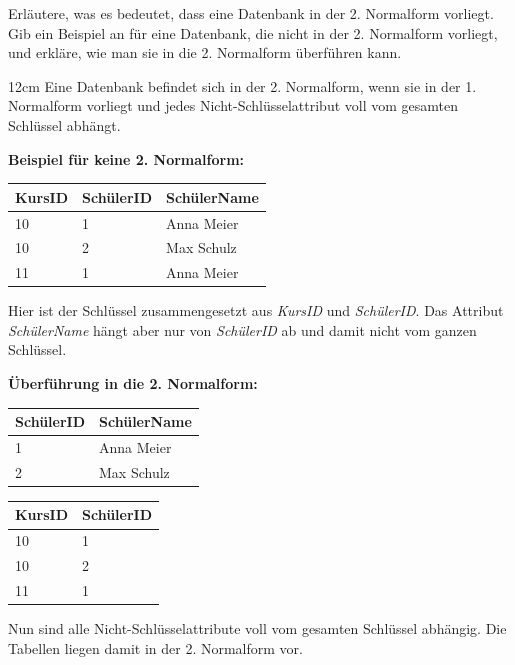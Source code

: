 \question[4]
Erläutere, was es bedeutet, dass eine Datenbank in der 2. Normalform vorliegt.
Gib ein Beispiel an für eine Datenbank, die nicht in der 2. Normalform vorliegt,
und erkläre, wie man sie in die 2. Normalform überführen kann.


\begin{solutionbox}{12cm}
Eine Datenbank befindet sich in der 2. Normalform, wenn sie in der 1. Normalform vorliegt
und jedes Nicht-Schlüsselattribut voll vom gesamten Schlüssel abhängt.

\vspace{0.2cm}

\textbf{Beispiel für keine 2. Normalform:}

\begin{center}
\begin{tabular}{|l|l|l|}
\hline
KursID & SchülerID & SchülerName \\
\hline
10 & 1 & Anna Meier \\
10 & 2 & Max Schulz \\
11 & 1 & Anna Meier \\
\hline
\end{tabular}
\end{center}

Hier ist der Schlüssel zusammengesetzt aus \textit{KursID} und \textit{SchülerID}.
Das Attribut \textit{SchülerName} hängt aber nur von \textit{SchülerID} ab und damit nicht vom ganzen Schlüssel.

\vspace{0.2cm}

\textbf{Überführung in die 2. Normalform:}

\begin{center}
\begin{tabular}{|l|l|}
\hline
SchülerID & SchülerName \\
\hline
1 & Anna Meier \\
2 & Max Schulz \\
\hline
\end{tabular}
\end{center}

\begin{center}
\begin{tabular}{|l|l|}
\hline
KursID & SchülerID \\
\hline
10 & 1 \\
10 & 2 \\
11 & 1 \\
\hline
\end{tabular}
\end{center}

Nun sind alle Nicht-Schlüsselattribute voll vom gesamten Schlüssel abhängig.
Die Tabellen liegen damit in der 2. Normalform vor.

\end{solutionbox}
